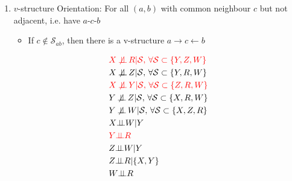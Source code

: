 \begin{enumerate}[topsep=2pt,itemsep=2pt]
\begin{center}
        \end{center}
    
    
    \item $ v $-structure Orientation: For all $ (a,b) $ with common neighbour $ c $ but not adjacent, i.e. have $ a $-$ c $-$ b $
    \begin{itemize}[topsep=2pt,itemsep=2pt]
        \item If $ c\notin \mathcal{S}_{ab} $, then there is a v-structure $ a\to c\leftarrow b $
    \end{itemize}
    \begin{center}
        \begin{minipage}{0.4\linewidth}
            \begin{align*}
                &\color{red}X \not\!\!\mathop{\independent} R |\mathcal{S},\,\forall \mathcal{S}\subset\{Y,Z,W\}\\
                &X \not\!\!\mathop{\independent} Z |\mathcal{S},\,\forall \mathcal{S}\subset\{Y,R,W\}\\
                &\color{red}X \not\!\!\mathop{\independent} Y |\mathcal{S},\,\forall \mathcal{S}\subset\{Z,R,W\}\\
                &Y \not\!\!\mathop{\independent} Z |\mathcal{S},\,\forall \mathcal{S}\subset\{X,R,W\}\\
                &Y \not\!\!\mathop{\independent} W |\mathcal{S},\,\forall \mathcal{S}\subset\{X,Z,R\}\\
                &X\independent W|Y\\
                &\color{red}Y\independent R\\
                &Z\independent W|Y\\
                &Z\independent R|\{X,Y\}\\
                &W\independent R
            \end{align*}
        \end{minipage}
\end{center}
\end{enumerate}
